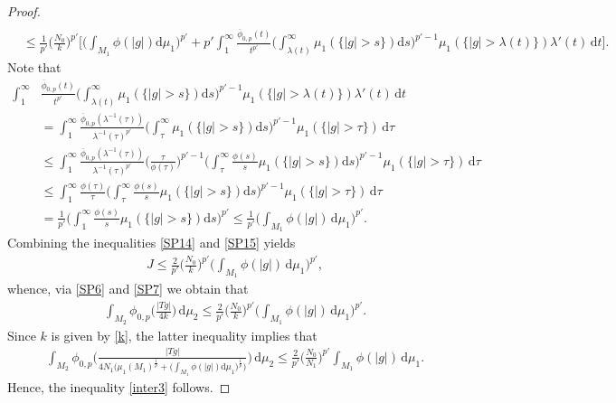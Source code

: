 \documentclass[leqno,11pt]{amsart}%
\numberwithin{equation}{section}
\def\d{\mathrm{d}}
\theoremstyle{definition}
\numberwithin{equation}{section}
\begin{document}
\begin{proof}
\begin{align}
    \\ \nonumber & \leq 
    \frac{1}{p'} \Big(\frac{N_0}{k}\Big)^{p'}\bigg[\bigg(\int_{M_1}\phi(|g|)\d \mu_1\bigg)^{p'} 
    + p'
    \int_1^\infty \frac{ \overline \phi_{0,p}(t)}{t^{p'}}\bigg(\int_{\lambda (t)}^\infty \mu_1(\{|g|>s\})\d s\bigg)^{p'-1} 
    \mu_1(\{|g|>\lambda (t)\})\lambda '(t)\, \d t\bigg].
    \end{align}
    Note that
\begin{align}
    \label{SP15}
    \int_1^\infty& \frac{  \overline \phi_{0,p}(t)}{t^{p'}}\bigg(\int_{\lambda (t)}^\infty \mu_1(\{|g|>s\})\d s\bigg)^{p'-1} 
    \mu_1(\{|g|>\lambda (t)\})\lambda '(t)\, \d t
    \\  \nonumber & = \int_1^\infty \frac{ \overline \phi_{0,p}(\lambda ^{-1}(\tau))}{\lambda ^{-1}(\tau)^{p'}}\bigg(\int_{\tau}^\infty \mu_1(\{|g|>s\})\d s\bigg)^{p'-1} 
    \mu_1(\{|g|>\tau\})\, \d \tau
    \\  \nonumber & \leq 
    \int_1^\infty \frac{ \overline \phi_{0,p}(\lambda ^{-1}(\tau))}{\lambda ^{-1}(\tau)^{p'}} \bigg(\frac{\tau}{\phi(\tau)}\bigg)^{p'-1}
\bigg(\int_{\tau}^\infty\frac{\phi(s)}{s} \mu_1(\{|g|>s\})\d s\bigg)^{p'-1} 
    \mu_1(\{|g|>\tau\})\, \d \tau
    \\  \nonumber & \leq\int_1^\infty \frac{\phi(\tau)}{\tau} 
\bigg(\int_{\tau}^\infty\frac{\phi(s)}{s} \mu_1(\{|g|>s\})\d s\bigg)^{p'-1} 
    \mu_1(\{|g|>\tau\})\, \d \tau
     \\  \nonumber & =\frac{1}{p'}\bigg(\int_{1}^\infty\frac{\phi(s)}{s} \mu_1(\{|g|>s\})\d s\bigg)^{p'} \leq \frac{1}{p'} \bigg(\int_{M_1}\phi(|g|)\, \d \mu_1\bigg)^{p'}.
\end{align}
Combining the inequalities \eqref{SP14} and \eqref{SP15} yields
\begin{align}
    \label{SP16}
    J \leq \frac{2}{p'} \Big(\frac{N_0}{k}\Big)^{p'}\bigg(\int_{M_1}\phi(|g|)\, \d \mu_1\bigg)^{p'},
\end{align}
    whence, via \eqref{SP6} and \eqref{SP7} we obtain that
    \begin{align}
        \label{SP17}
        \int_{M_2}   \phi_{0,p}\Big(\frac{|Tg|}{4k}\Big)\, \d\mu_2 \leq \frac{2}{p'} \Big(\frac{N_0}{k}\Big)^{p'}\bigg(\int_{M_1}\phi(|g|)\, \d \mu_1\bigg)^{p'}.
    \end{align}
    Since $k$ is given by \eqref{k}, the latter inequality implies that
    \begin{align}
        \label{SP18}
           \int_{M_2}   \phi_{0,p}\Bigg(\frac{|Tg|}{4 N_1 
       \big(\mu_1(M_1)^{\frac 1p} + \big(\int_{M_1}\phi(|g|)\d \mu_1\big)^{\frac 1p}\big)
        }\Bigg)\, \d\mu_2 \leq \frac{2}{p'} \Big(\frac{N_0}{N_1}\Big)^{p'} \int_{M_1}\phi(|g|)\, \d \mu_1.
    \end{align}
    Hence, the inequality \eqref{inter3} follows.
\end{proof}
\end{document}
